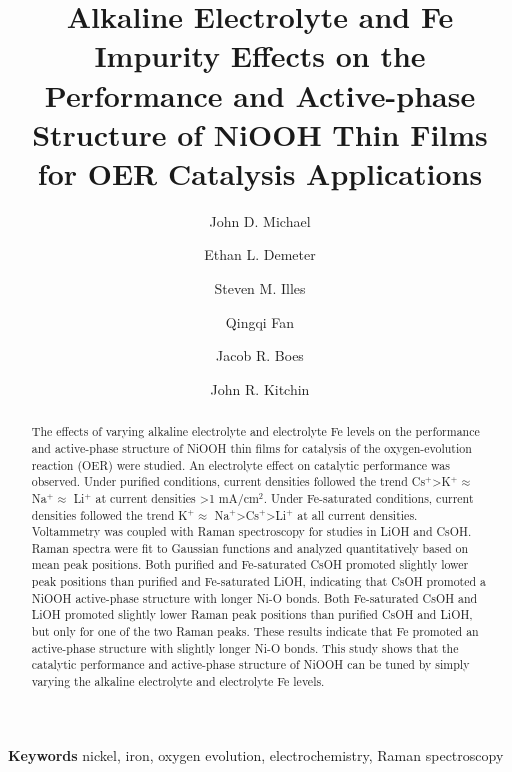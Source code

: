 \documentclass[journal=jpccck,manuscript=article,email=true]{achemso}
\author{John D. Michael}
\author{Ethan L. Demeter}
\author{Steven M. Illes}
\author{Qingqi Fan}
\author{Jacob R. Boes}
\author{John R. Kitchin}
\affiliation{Department of Chemical Engineering, Carnegie Mellon University, 5000 Forbes Ave, Pittsburgh, PA 15213}
\date{}
\title{Alkaline Electrolyte and Fe Impurity Effects on the Performance and Active-phase Structure of NiOOH Thin Films for OER Catalysis Applications}
\begin{document}
\newpage

\begin{abstract}
The effects of varying alkaline electrolyte and electrolyte Fe levels on the performance and active-phase structure of NiOOH thin films for catalysis of the oxygen-evolution reaction (OER) were studied. An electrolyte effect on catalytic performance was observed. Under purified conditions, current densities followed the trend Cs$^{\text{+}}$\textgreater K$^{\text{+}}$$\approx$ Na$^{\text{+}}$$\approx$ Li$^{\text{+}}$ at current densities \textgreater1 mA/cm$^{\text{2}}$. Under Fe-saturated conditions, current densities followed the trend K$^{\text{+}}$$\approx$ Na$^{\text{+}}$\textgreater Cs$^{\text{+}}$\textgreater Li$^{\text{+}}$ at all current densities. Voltammetry was coupled with Raman spectroscopy for studies in LiOH and CsOH. Raman spectra were fit to Gaussian functions and analyzed quantitatively based on mean peak positions. Both purified and Fe-saturated CsOH promoted slightly lower peak positions than purified and Fe-saturated LiOH, indicating that CsOH promoted a NiOOH active-phase structure with longer Ni-O bonds. Both Fe-saturated CsOH and LiOH promoted slightly lower Raman peak positions than purified CsOH and LiOH, but only for one of the two Raman peaks. These results indicate that Fe promoted an active-phase structure with slightly longer Ni-O bonds. This study shows that the catalytic performance and active-phase structure of NiOOH can be tuned by simply varying the alkaline electrolyte and electrolyte Fe levels.
\end{abstract}
\textbf{Keywords} nickel, iron, oxygen evolution, electrochemistry, Raman spectroscopy

\newpage
\end{document}
